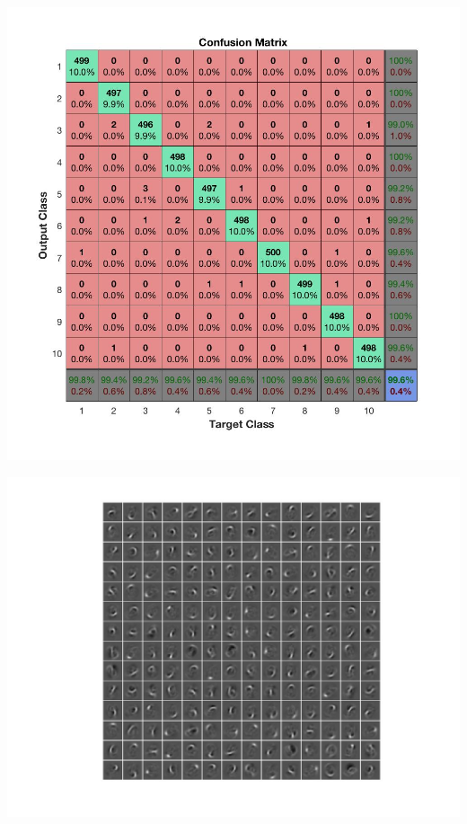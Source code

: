 \documentclass[a4paper,11pt]{article}
\begin{document}
\begin{itemize}
	\includegraphics[scale=0.4]{2}
\end{itemize}

\includegraphics[scale=0.5]{4}\\


\vfill
\end{document}

